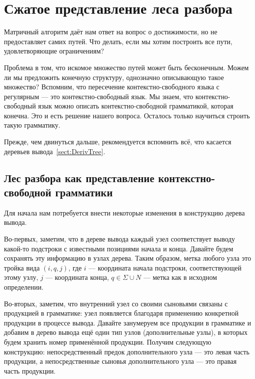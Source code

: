 \chapter{Сжатое представление леса разбора}

Матричный алгоритм даёт нам ответ на вопрос о достижимости, но не предоставляет самих путей.
Что делать, если мы хотим построить все пути, удовлетворяющие ограничениям?

Проблема в том, что искомое множество путей может быть бесконечным.
Можем ли мы предложить конечную структуру, однозначно описывающую такое множество?
Вспомним, что пересечение контекстно-свободного языка с регулярным --- это контекстно-свободный язык.
Мы знаем, что контекстно-свободный язык можно описать контекстно-свободной грамматикой, которая конечна.
Это и есть решение нашего вопроса.
Осталось только научиться строить такую грамматику.

Прежде, чем двинуться дальше, рекомендуется вспомнить всё, что касается деревьев вывода~\ref{sect:DerivTree}.

\section[Лес разбора как представление контекстно-свободной грамматики]{Лес разбора как представление контекстно-свободной грамматики}

Для начала нам потребуется внести некоторые изменения в конструкцию дерева вывода.

Во-первых, заметим, что в дереве вывода каждый узел соответствует выводу какой-то подстроки с известными позициями начала и конца.
Давайте будем сохранять эту информацию в узлах дерева.
Таким образом, метка любого узла это тройка вида $(i,q,j)$, где $i$ --- координата начала подстроки, соответствующей этому узлу, $j$ --- координата конца, $q \in \Sigma \cup N$ --- метка как в исходном определении.

Во-вторых, заметим, что внутренний узел со своими сыновьями связаны с продукцией в грамматике: узел появляется благодаря применению конкретной продукции в процессе вывода.
Давайте занумеруем все продукции в грамматике и добавим в дерево вывода ещё один тип узлов (дополнительные узлы), в которых будем хранить номер применённой продукции.
Получим следующую конструкцию: непосредственный предок дополнительного узла --- это левая часть продукции, а непосредственные сыновья дополнительного узла --- это правая часть продукции.

